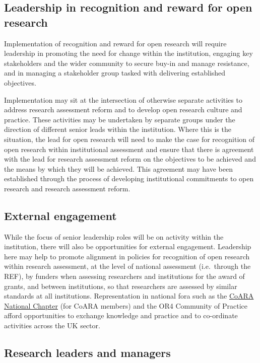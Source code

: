 \documentclass[
  letterpaper,
  DIV=11,
  numbers=noendperiod,
  oneside]{scrreprt}
\begin{document}
\subsection{Leadership in recognition and reward for open
research}\label{leadership-in-recognition-and-reward-for-open-research}

Implementation of recognition and reward for open research will require
leadership in promoting the need for change within the institution,
engaging key stakeholders and the wider community to secure buy-in and
manage resistance, and in managing a stakeholder group tasked with
delivering established objectives.

Implementation may sit at the intersection of otherwise separate
activities to address research assessment reform and to develop open
research culture and practice. These activities may be undertaken by
separate groups under the direction of different senior leads within the
institution. Where this is the situation, the lead for open research
will need to make the case for recognition of open research within
institutional assessment and ensure that there is agreement with the
lead for research assessment reform on the objectives to be achieved and
the means by which they will be achieved. This agreement may have been
established through the process of developing institutional commitments
to open research and research assessment reform.

\subsection{External engagement}\label{external-engagement}

While the focus of senior leadership roles will be on activity within
the institution, there will also be opportunities for external
engagement. Leadership here may help to promote alignment in policies
for recognition of open research within research assessment, at the
level of national assessment (i.e.~through the REF), by funders when
assessing researchers and institutions for the award of grants, and
between institutions, so that researchers are assessed by similar
standards at all institutions. Representation in national fora such as
the
\href{https://coara.eu/coalition/national-chapters/coara-national-chapter-uk-2/}{CoARA
National Chapter} (for CoARA members) and the OR4 Community of Practice
afford opportunities to exchange knowledge and practice and to
co-ordinate activities across the UK sector.

\subsection{Research leaders and
managers}\label{research-leaders-and-managers}
\end{document}
